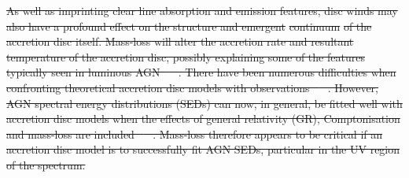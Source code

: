 \documentclass[preprint, a4paper, 11pt]{aastex}
\providecommand{\DIFdel}[1]{{\protect\color{red}\sout{#1}}}                      %
\providecommand{\DIFdelbegin}{} %
\providecommand{\DIFdelend}{} %
\begin{document}
\DIFdelbegin \DIFdel{As well as imprinting clear line absorption and emission
features, disc winds may also have a profound effect on the structure and 
emergent }%
\DIFdel{continuum}%
\DIFdel{of the accretion disc itself.
Mass-loss will alter the accretion rate and resultant 
temperature of the accretion disc, possibly explaining some 
of the features typically seen in luminous AGN \mbox{%
\citep{knigge1999,laordavis2014}
}%
.
There have been numerous difficulties when confronting 
theoretical accretion disc models with observations 
\mbox{%
\citep[see e.g.][]{blaes1998}
}%
. However, AGN spectral energy distributions (SEDs) can now, 
in general, be fitted well with accretion disc models
when the effects of general relativity (GR), Comptonisation
and mass-loss are included \mbox{%
\citep{capellupo2015}
}%
. Mass-loss therefore appears to be 
critical if an accretion disc model is to successfully fit AGN SEDs, 
particular in the UV region of the spectrum.
}\DIFdelend %
\end{document}
